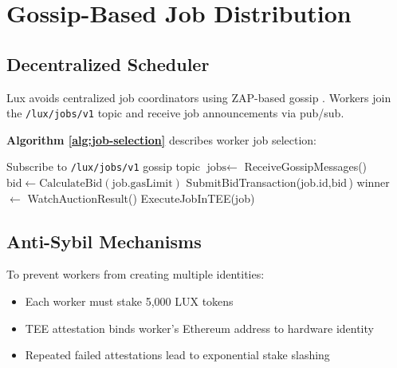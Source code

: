 \section{Gossip-Based Job Distribution}

\label{sec:scheduler}

\subsection{Decentralized Scheduler}

Lux avoids centralized job coordinators using ZAP-based gossip \cite{zap-protocol}. Workers join the \texttt{/lux/jobs/v1} topic and receive job announcements via pub/sub.

\textbf{Algorithm \ref{alg:job-selection}} describes worker job selection:

\begin{algorithm}
\caption{Worker Job Selection Protocol}
\label{alg:job-selection}
\begin{algorithmic}[1]
\STATE Subscribe to \texttt{/lux/jobs/v1} gossip topic
  \STATE $\text{jobs} \leftarrow$ ReceiveGossipMessages()
        \STATE $\text{bid} \leftarrow \text{CalculateBid}(\text{job.gasLimit})$
        \STATE SubmitBidTransaction($\text{job.id}, \text{bid}$)
      \ENDIF
    \ENDIF
  \ENDFOR
  \STATE winner $\leftarrow$ WatchAuctionResult()
    \STATE ExecuteJobInTEE(job)
  \ENDIF
\ENDWHILE
\end{algorithmic}
\end{algorithm}

\subsection{Anti-Sybil Mechanisms}

To prevent workers from creating multiple identities:

\begin{itemize}
  \item Each worker must stake 5,000 LUX tokens
  \item TEE attestation binds worker's Ethereum address to hardware identity
  \item Repeated failed attestations lead to exponential stake slashing
\end{itemize}

